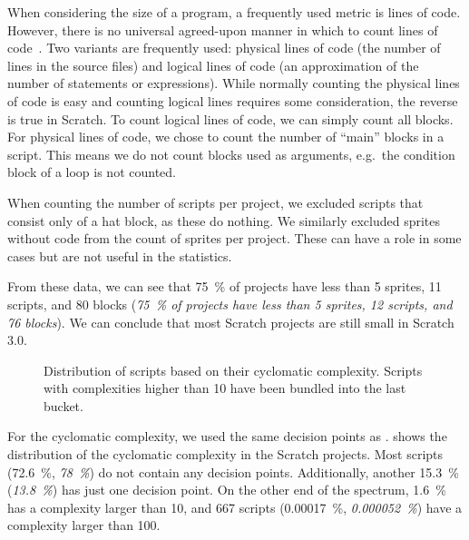 \documentclass[../main]{subfiles}
\begin{document}
When considering the size of a program, a frequently used metric is lines of code.
However, there is no universal agreed-upon manner in which to count lines of code~\autocite{nguyenSLOCCountingStandard2007}.
Two variants are frequently used: physical lines of code (the number of lines in the source files) and logical lines of code (an approximation of the number of statements or expressions).
While normally counting the physical lines of code is easy and counting logical lines requires some consideration, the reverse is true in Scratch.
To count logical lines of code, we can simply count all blocks.
For physical lines of code, we chose to count the number of ``main'' blocks in a script.
This means we do not count blocks used as arguments, e.g.\ the condition block of a loop is not counted.

When counting the number of scripts per project, we excluded scripts that consist only of a hat block, as these do nothing.
We similarly excluded sprites without code from the count of sprites per project.
These can have a role in some cases but are not useful in the statistics.

From these data, we can see that \qty{75}{\percent} of projects have less than 5 sprites, 11 scripts, and 80 blocks (\textit{\qty{75}{\percent} of projects have less than 5 sprites, 12 scripts, and 76 blocks}).
We can conclude that most Scratch projects are still small in Scratch 3.0.

\begin{figure}
    \begin{wide}
        
    \end{wide}
    \caption{
        Distribution of scripts based on their cyclomatic complexity.
        Scripts with complexities higher than 10 have been bundled into the last bucket.
    }
    \label{fig:scratch-cc}
\end{figure}

For the cyclomatic complexity, we used the same decision points as \citeauthor{aivaloglouHowKidsCode2016}.
 shows the distribution of the cyclomatic complexity in the Scratch projects.
Most scripts (\qty{72.6}{\percent}, \textit{\qty{78}{\percent}}) do not contain any decision points.
Additionally, another \qty{15.3}{\percent} (\textit{\qty{13.8}{\percent}}) has just one decision point.
On the other end of the spectrum, \qty{1.6}{\percent} has a complexity larger than 10, and 667 scripts (\qty{0.00017}{\percent}, \textit{\qty{0.000052}{\percent}}) have a complexity larger than 100.
\end{document}

